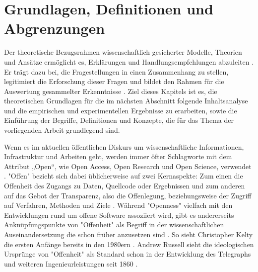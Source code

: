 \chapter{Grundlagen, Definitionen und Abgrenzungen}

Der theoretische Bezugsrahmen wissenschaftlich gesicherter Modelle, Theorien und Ansätze ermöglicht es, Erklärungen und Handlungsempfehlungen abzuleiten \cite{martin_2007_wissenschaftstheorie}. Er trägt dazu bei, die Fragestellungen in einen Zusammenhang zu stellen, legitimiert die Erforschung dieser Fragen und bildet den Rahmen für die Auswertung gesammelter Erkenntnisse \cite{suchen}. Ziel dieses Kapitels ist es, die theoretischen Grundlagen für die im nächsten Abschnitt folgende Inhaltsanalyse und die empirischen und experimentellen Ergebnisse zu erarbeiten, sowie die Einführung der Begriffe, Definitionen und Konzepte, die für das Thema der vorliegenden Arbeit grundlegend sind.

Wenn es im aktuellen öffentlichen Diskurs um wissenschaftliche Informationen, Infrastruktur und Arbeiten geht, werden immer öfter Schlagworte mit dem Attribut „Open“, wie Open Access, Open Research und Open Science, verwendet \cite{bunz_2014} \cite{schulze_2013_open}. "Offen" bezieht sich dabei üblicherweise auf zwei Kernaspekte: Zum einen die Offenheit des Zugangs zu Daten, Quellcode oder Ergebnissen und zum anderen auf das Gebot der Transparenz, also die Offenlegung, beziehungsweise der Zugriff auf Verfahren, Methoden und Ziele \cite{schulze_2013_open}. Während "Openness" vielfach mit den Entwicklungen rund um offene Software assoziiert wird, gibt es andererseits Anknüpfungspunkte von "Offenheit" als Begriff in der wissenschaftlichen Auseinandersetzung die schon früher anzusetzen sind \cite{Tkacz_2014}. So sieht Christopher Kel­ty die ersten Anfänge bereits in den 1980ern \cite{kelty_2008_two_bits}. Andrew Russell sieht die ideologischen Ursprünge von "Offenheit" als Standard schon in der Entwicklung des Telegraphs und weiteren Ingenieurleistungen seit 1860 \cite{Russell_2014}.

